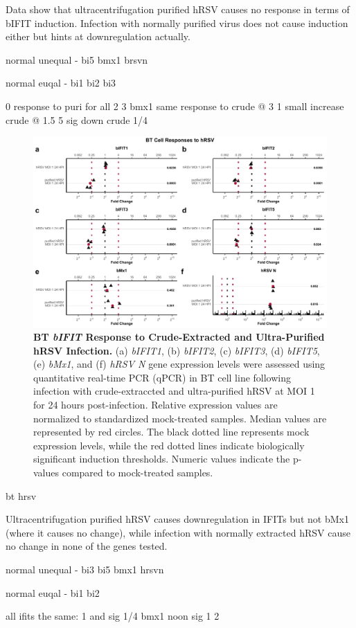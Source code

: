 Data show that ultracentrifugation purified hRSV causes no response in terms of bIFIT induction. Infection with normally purified virus does not cause induction either but hints at downregulation actually.

normal unequal - bi5 bmx1 brsvn

normal euqal - bi1 bi2 bi3 

0 response to puri for all
2 3 bmx1 same response to crude @ 3
1 small increase crude @ 1.5
5 sig down crude 1/4


\begin{figure}
    \centering
    \includegraphics[width=1\linewidth]{07. Chapter 2/Figs/02. Induction/10. bt_hrsv.pdf}
    \caption[BT \textit{bIFIT} Response to Crude-Extracted and Ultra-Purified hRSV Infection.]{\textbf{BT \textit{bIFIT} Response to Crude-Extracted and Ultra-Purified hRSV Infection.} (a) \textit{bIFIT1}, (b) \textit{bIFIT2}, (c) \textit{bIFIT3}, (d) \textit{bIFIT5}, (e) \textit{bMx1}, and (f) \textit{hRSV N} gene expression levels were assessed using quantitative real-time PCR (qPCR) in BT cell line following infection with crude-extraccted and ultra-purified hRSV at MOI 1 for 24 hours post-infection. Relative expression values are normalized to standardized mock-treated samples. Median values are represented by red circles. The black dotted line represents mock expression levels, while the red dotted lines indicate biologically significant induction thresholds. Numeric values indicate the p-values compared to mock-treated samples.}
    \label{fig:Bt responses to hRSV}
\end{figure}

bt hrsv

Ultracentrifugation purified hRSV causes downregulation in IFITs but not bMx1 (where it causes no change), while infection with normally extracted hRSV cause no change in none of the genes tested. 

normal unequal - bi3 bi5 bmx1 hrsvn

normal euqal - bi1 bi2

all ifits the same: 1 and sig 1/4
bmx1 noon sig 1 2 